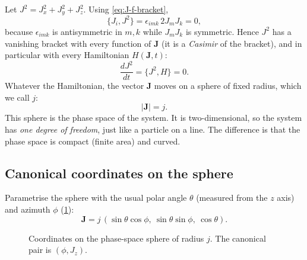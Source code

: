 \documentclass[11pt,a4paper]{article}
\newcommand{\vJ}{\bm{J}}
\newcommand{\PB}[2]{\{#1,#2\}}
\begin{document}
Let $J^2 = J_x^2 + J_y^2 + J_z^2$. Using \eqref{eq:J-f-bracket},
\begin{equation}
  \PB{J_i}{J^2} = \epsilon_{imk}\, 2 J_m J_k = 0 ,
\end{equation}
because $\epsilon_{imk}$ is antisymmetric in $m,k$ while $J_m J_k$ is symmetric. Hence $J^2$ has a vanishing bracket
with every function of $\vJ$ (it is a \emph{Casimir} of the bracket), and in particular with every Hamiltonian
$H(\vJ,t)$:
\begin{equation}
  \frac{d J^2}{dt} = \PB{J^2}{H} = 0 .
\end{equation}
Whatever the Hamiltonian, the vector $\vJ$ moves on a sphere of fixed radius, which we call $j$:
\begin{equation}
  |\vJ| = j .
\end{equation}
This sphere is the phase space of the system. It is two-dimensional, so the system has \emph{one degree of freedom},
just like a particle on a line. The difference is that the phase space is compact (finite area) and curved.

\subsection{Canonical coordinates on the sphere}\label{sec:canonical}

Parametrise the sphere with the usual polar angle $\theta$ (measured from the $z$ axis) and azimuth $\phi$
(\cref{fig:sphere-coords}):
\begin{equation}\label{eq:spherical}
  \vJ = j\,(\sin\theta\cos\phi,\ \sin\theta\sin\phi,\ \cos\theta).
\end{equation}
\begin{figure}[!htbp]
  \centering
  \caption{Coordinates on the phase-space sphere of radius $j$. The canonical pair is $(\phi, J_z)$.}
  \label{fig:sphere-coords}
\end{figure}
\end{document}
